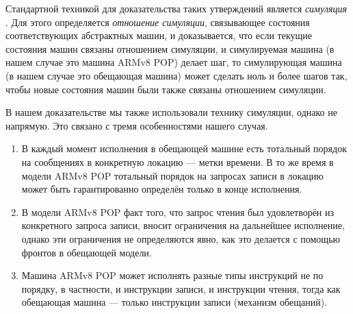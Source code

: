 Стандартной техникой для доказательства таких утверждений является
\emph{симуляция} \cite{Milner:Book89, Lynch-Vaandrager:IC95, Lynch-Vaandrager:IC96}.
Для этого определяется \emph{отношение симуляции}, связывающее состояния соответствующих
абстрактных машин, и доказывается, что если текущие состояния машин
связаны отношением симуляции, и симулируемая машина (в нашем случае это машина ARMv8 POP)
делает шаг, то симулирующая машина (в нашем случае это обещающая машина) может сделать ноль
и более шагов так, чтобы новые состояния машин были также связаны отношением симуляции.

В нашем доказательстве мы также использовали технику симуляции, однако не напрямую.
Это связано с тремя особенностями нашего случая.
\begin{enumerate}
  \item В каждый момент исполнения в обещающей машине есть тотальный
    порядок на сообщениях в конкретную локацию --- метки времени.
    В то же время в модели ARMv8 POP тотальный порядок на запросах записи 
    в локацию может быть гарантированно определён только в конце исполнения.
  \item В модели ARMv8 POP факт того, что запрос чтения был удовлетворён
    из конкретного запроса записи, вносит ограничения на дальнейшее исполнение,
    однако эти ограничения не определяются явно, как это делается с помощью
    фронтов в обещающей модели.
  \item Машина ARMv8 POP может исполнять разные типы инструкций не по порядку,
    в частности, и инструкции записи, и инструкции чтения, тогда как
    обещающая машина --- только инструкции записи (механизм обещаний).
\end{enumerate}

